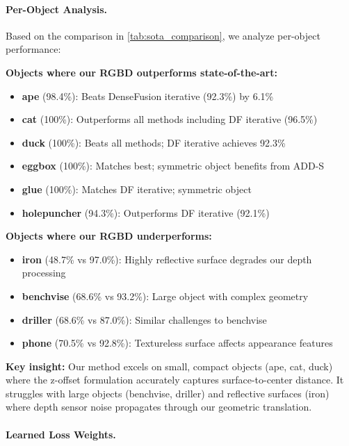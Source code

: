 \paragraph{Per-Object Analysis.}

Based on the comparison in \cref{tab:sota_comparison}, we analyze per-object performance:

\textbf{Objects where our RGBD outperforms state-of-the-art:}
\begin{itemize}
    \item \textbf{ape} (98.4\%): Beats DenseFusion iterative (92.3\%) by 6.1\%
    \item \textbf{cat} (100\%): Outperforms all methods including DF iterative (96.5\%)
    \item \textbf{duck} (100\%): Beats all methods; DF iterative achieves 92.3\%
    \item \textbf{eggbox} (100\%): Matches best; symmetric object benefits from ADD-S
    \item \textbf{glue} (100\%): Matches DF iterative; symmetric object
    \item \textbf{holepuncher} (94.3\%): Outperforms DF iterative (92.1\%)
\end{itemize}

\textbf{Objects where our RGBD underperforms:}
\begin{itemize}
    \item \textbf{iron} (48.7\% vs 97.0\%): Highly reflective surface degrades our depth processing
    \item \textbf{benchvise} (68.6\% vs 93.2\%): Large object with complex geometry
    \item \textbf{driller} (68.6\% vs 87.0\%): Similar challenges to benchvise
    \item \textbf{phone} (70.5\% vs 92.8\%): Textureless surface affects appearance features
\end{itemize}

\textbf{Key insight:} Our method excels on small, compact objects (ape, cat, duck) where the z-offset formulation accurately captures surface-to-center distance. It struggles with large objects (benchvise, driller) and reflective surfaces (iron) where depth sensor noise propagates through our geometric translation.


\paragraph{Learned Loss Weights.}

